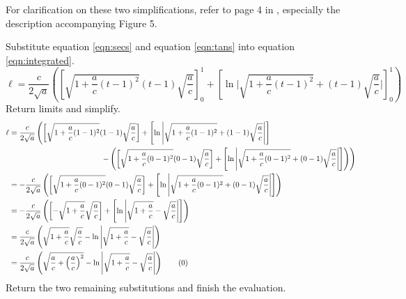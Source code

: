 \documentclass{article}
\begin{document}
For clarification on these two simplifications, refer to page 4 in \cite{Bib:SORVolumes}, especially the description accompanying Figure 5.\par
Substitute equation \ref{eqn:secs} and equation \ref{eqn:tans} into equation \ref{eqn:integrated}.
\begin{equation*}
    \ell = \frac{c}{2\sqrt{a}}\left(\left[\sqrt{1+\frac{a}{c}(t-1)^2}(t-1)\sqrt{\frac{a}{c}}\right]_0^1+\left[\ln\Bigg|\sqrt{1+\frac{a}{c}(t-1)^2}+(t-1)\sqrt{\frac{a}{c}}\Bigg|\right]_0^1\right)
\end{equation*}
Return limits and simplify.
\begin{align*}
    \ell &= \frac{c}{2\sqrt{a}}\left(\left[\sqrt{1+\frac{a}{c}(1-1)^2}(1-1)\sqrt{\frac{a}{c}}\right]+\left[\ln\Bigg|\sqrt{1+\frac{a}{c}(1-1)^2}+(1-1)\sqrt{\frac{a}{c}}\Bigg|\right]\right.\\
    &\hspace{12em} \left.-\left(\left[\sqrt{1+\frac{a}{c}(0-1)^2}(0-1)\sqrt{\frac{a}{c}}\right]+\left[\ln\Bigg|\sqrt{1+\frac{a}{c}(0-1)^2}+(0-1)\sqrt{\frac{a}{c}}\Bigg|\right]\right)\right)\\
    &= -\frac{c}{2\sqrt{a}}\left(\left[\sqrt{1+\frac{a}{c}(0-1)^2}(0-1)\sqrt{\frac{a}{c}}\right]+\left[\ln\Bigg|\sqrt{1+\frac{a}{c}(0-1)^2}+(0-1)\sqrt{\frac{a}{c}}\Bigg|\right]\right)\\
    &= -\frac{c}{2\sqrt{a}}\left(\left[-\sqrt{1+\frac{a}{c}}\sqrt{\frac{a}{c}}\right]+\left[\ln\Bigg|\sqrt{1+\frac{a}{c}}-\sqrt{\frac{a}{c}}\Bigg|\right]\right)\\
    &= \frac{c}{2\sqrt{a}}\left(\sqrt{1+\frac{a}{c}}\sqrt{\frac{a}{c}}-\ln\Bigg|\sqrt{1+\frac{a}{c}}-\sqrt{\frac{a}{c}}\Bigg|\right)\\
    &= \frac{c}{2\sqrt{a}}\left(\sqrt{\frac{a}{c}+\left(\frac{a}{c}\right)^2}-\ln\Bigg|\sqrt{1+\frac{a}{c}}-\sqrt{\frac{a}{c}}\Bigg|\right)\tag{\theequation}\label{eqn:ac}
    \stepcounter{equation}
\end{align*}
Return the two remaining substitutions and finish the evaluation.
\end{document}
